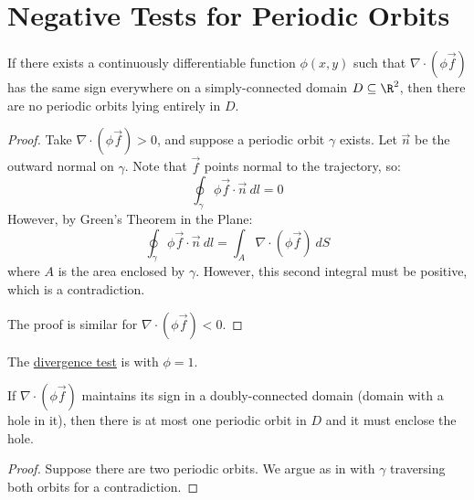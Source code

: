 \documentclass[../Main.tex]{subfiles}
\begin{document}
\section{Negative Tests for Periodic Orbits}
\begin{theorem}
    If there exists a continuously differentiable function $\phi(x, y)$ such that $\nabla \cdot (\phi \vec{f})$ has the same sign everywhere on a simply-connected domain $D \subseteq \R^2$, then there are no periodic orbits lying entirely in $D$.
    \label{thmDulac}
\end{theorem}
\begin{proof}
    Take $\nabla \cdot (\phi \vec{f}) > 0$, and suppose a periodic orbit $\gamma$ exists. Let $\vec{n}$ be the outward normal on $\gamma$. Note that $\vec{f}$ points normal to the trajectory, so:
    \begin{equation*}
        \oint_\gamma \phi \vec{f} \cdot \vec{n}~dl = 0
    \end{equation*}
    However, by Green's Theorem in the Plane:
    \begin{equation*}
        \oint_\gamma \phi \vec{f} \cdot \vec{n}~dl = \int_A \nabla \cdot (\phi \vec{f})~dS 
    \end{equation*}
    where $A$ is the area enclosed by $\gamma$. However, this second integral must be positive, which is a contradiction.

    The proof is similar for $\nabla \cdot (\phi \vec{f}) < 0$.
\end{proof}
\begin{remark}
    The \underline{divergence test} is  with $\phi = 1$.
\end{remark}
\begin{corollary}
    If $\nabla \cdot (\phi\vec f)$ maintains its sign in a doubly-connected domain (domain with a hole in it), then there is at most one periodic orbit in $D$ and it must enclose the hole.
    \label{corDblConnected}
\end{corollary}
\begin{proof}
    Suppose there are two periodic orbits. We argue as in  with $\gamma$ traversing both orbits for a contradiction.
\end{proof}
\end{document}
